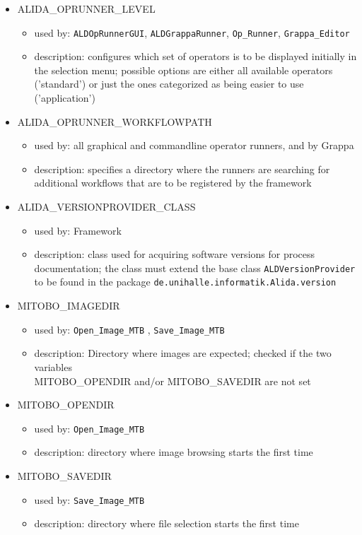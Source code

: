 \begin{itemize}
\item ALIDA\_OPRUNNER\_LEVEL
	\begin{itemize}
	    \item used by: {\tt ALDOpRunnerGUI}, {\tt ALDGrappaRunner}, {\tt Op\_Runner}, {\tt Grappa\_Editor}
	    \item description: configures which set of operators is to be displayed initially in the selection menu; 
	    	possible options are either all available operators ('standard') or just the ones categorized as being easier 
	    	to use ('application') 
	\end{itemize}
\item ALIDA\_OPRUNNER\_WORKFLOWPATH
	\begin{itemize}
	    \item used by: all graphical and commandline operator runners, and by Grappa
	    \item description: specifies a directory where the runners are searching for additional workflows that are to be registered
	    	by the framework
	\end{itemize}
\item ALIDA\_VERSIONPROVIDER\_CLASS
	\begin{itemize}
	    \item used by: Framework
	    \item description: class used for acquiring software versions for process documentation; the class must extend the base class 
	    	{\tt ALDVersionProvider} to be found in the \alida package {\tt de.unihalle.informatik.Alida.version}  
	\end{itemize}
\item MITOBO\_IMAGEDIR
	\begin{itemize}
	    \item used by: {\tt Open\_Image\_MTB} , {\tt Save\_Image\_MTB}
	    \item description: Directory where images are expected; checked if the two variables\\
	    	MITOBO\_OPENDIR and/or MITOBO\_SAVEDIR	are not set
	\end{itemize}
\item MITOBO\_OPENDIR
	\begin{itemize}
	    \item used by: {\tt Open\_Image\_MTB}
	    \item description: directory where image browsing starts the first time 
	\end{itemize}
\item MITOBO\_SAVEDIR
	\begin{itemize}
	    \item used by: {\tt Save\_Image\_MTB}
	    \item description: directory where file selection starts the first time 
	\end{itemize}
\end{itemize}

